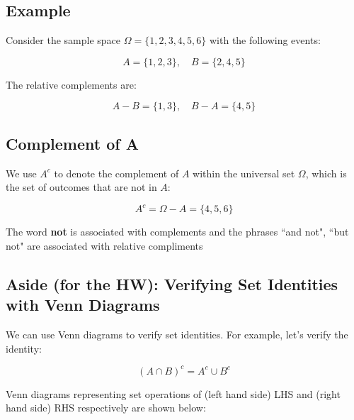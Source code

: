 \documentclass{article}
\begin{document}
\subsection*{Example}

Consider the sample space \(\Omega = \{1, 2, 3, 4, 5, 6\}\) with the following events:

\[
A = \{1, 2, 3\}, \quad B = \{2, 4, 5\}
\]

The relative complements are:

\[
A - B = \{1, 3\}, \quad B - A = \{4, 5\}
\]


\subsection*{Complement of A}

We use \(A^c\) to denote the complement of \(A\) within the universal set \(\Omega\), which is the set of outcomes that are not in \(A\):

\[
A^c = \Omega - A = \{4, 5, 6\}
\]

The word \textbf{not} is associated with complements and the phrases ``and not", ``but not" are associated with relative compliments

\subsection*{Aside (for the HW): Verifying Set Identities with Venn Diagrams}

We can use Venn diagrams to verify set identities. For example, let's verify the identity:

\[
(A \cap B)^c = A^c \cup B^c
\]

Venn diagrams representing set operations of (left hand side) LHS and (right hand side) RHS respectively are shown below:
\end{document}
